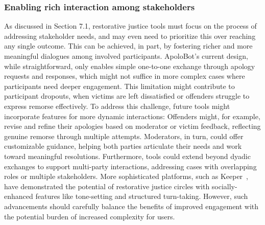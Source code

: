 \subsubsection{Enabling rich interaction among stakeholders}
As discussed in Section 7.1, restorative justice tools must focus on the process of addressing stakeholder needs, and may even need to prioritize this over reaching any single outcome. This can be achieved, in part, by fostering richer and more meaningful dialogues among involved participants. ApoloBot's current design, while straightforward, only enables simple one-to-one exchange through apology requests and responses, which might not suffice in more complex cases where participants need deeper engagement. This limitation might contribute to participant dropouts, when victims are left dissatisfied or offenders struggle to express remorse effectively. To address this challenge, future tools might incorporate features for more dynamic interactions: Offenders might, for example, revise and refine their apologies based on moderator or victim feedback, reflecting genuine remorse through multiple attempts. Moderators, in turn, could offer customizable guidance, helping both parties articulate their needs and work toward meaningful resolutions.
Furthermore, tools could extend beyond dyadic exchanges to support multi-party interactions, addressing cases with overlapping roles or multiple stakeholders.
More sophisticated platforms, such as Keeper~\cite{Hughes2020}, have demonstrated the potential of restorative justice circles with socially-enhanced features like tone-setting and structured turn-taking. However, such advancements should carefully balance the benefits of improved engagement with the potential burden of increased complexity for users.



